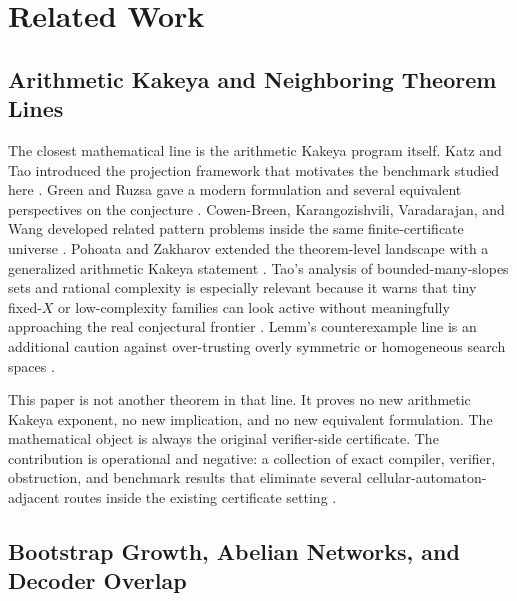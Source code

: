 \documentclass[11pt]{article}
\theoremstyle{definition}
\begin{document}
\section{Related Work}
\label{sec:related}

\subsection{Arithmetic Kakeya and Neighboring Theorem Lines}

The closest mathematical line is the arithmetic Kakeya program itself. Katz and Tao introduced the projection framework that motivates the benchmark studied here \citep{katz1999}. Green and Ruzsa gave a modern formulation and several equivalent perspectives on the conjecture \citep{green2017}. Cowen-Breen, Karangozishvili, Varadarajan, and Wang developed related pattern problems inside the same finite-certificate universe \citep{cowenbreen2020}. Pohoata and Zakharov extended the theorem-level landscape with a generalized arithmetic Kakeya statement \citep{pohoata2024}. Tao's analysis of bounded-many-slopes sets and rational complexity is especially relevant because it warns that tiny fixed-$X$ or low-complexity families can look active without meaningfully approaching the real conjectural frontier \citep{tao2025}. Lemm's counterexample line is an additional caution against over-trusting overly symmetric or homogeneous search spaces \citep{lemm2014}.

This paper is not another theorem in that line. It proves no new arithmetic Kakeya exponent, no new implication, and no new equivalent formulation. The mathematical object is always the original verifier-side certificate. The contribution is operational and negative: a collection of exact compiler, verifier, obstruction, and benchmark results that eliminate several cellular-automaton-adjacent routes inside the existing certificate setting \citep{archivara_prior_art_gap,archivara_benchmark_report}.

\subsection{Bootstrap Growth, Abelian Networks, and Decoder Overlap}
\end{document}
